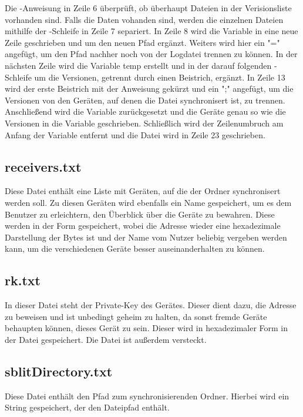 Die -Anweisung in Zeile 6 überprüft, ob überhaupt Dateien in der Verisionsliste vorhanden sind. Falls die Daten vohanden sind, werden die einzelnen Dateien mithilfe der -Schleife in Zeile 7 separiert. In Zeile 8 wird die  Variable in eine neue Zeile geschrieben und um den neuen Pfad ergänzt. Weiters wird hier ein "=" angefügt, um den Pfad nachher noch von der Logdatei trennen zu können. In der nächsten Zeile wird die Variable temp erstellt und in der darauf folgenden -Schleife um die Versionen, getrennt durch einen Beistrich, ergänzt. In Zeile 13 wird der erste Beistrich mit der Anweisung  gekürzt und ein ";" angefügt, um die Versionen von den Geräten, auf denen die Datei synchronisert ist, zu trennen. Anschließend wird die Variable  zurückgesetzt und die Geräte genau so wie die Versionen in die Variable  geschrieben. Schließlich wird der Zeilenumbruch am Anfang der Variable  entfernt und die Datei wird in Zeile 23 geschrieben.

\subsection{receivers.txt} \label{receivers}
Diese Datei enthält eine Liste mit Geräten, auf die der Ordner synchronisert werden soll. Zu diesen Geräten wird ebenfalls ein Name gespeichert, um es dem Benutzer zu erleichtern, den Überblick über die Geräte zu bewahren. Diese werden in der Form  gespeichert, wobei die Adresse wieder eine hexadezimale Darstellung der Bytes ist und der Name vom Nutzer beliebig vergeben werden kann, um die verschiedenen Geräte besser auseinanderhalten zu können.

\subsection{rk.txt}
In dieser Datei steht der Private-Key des Gerätes. Dieser dient dazu, die Adresse zu beweisen und ist unbedingt geheim zu halten, da sonst fremde Geräte behaupten können, dieses Gerät zu sein. Dieser wird in hexadezimaler Form in der Datei gespeichert. Die Datei ist außerdem versteckt.

\subsection{sblitDirectory.txt}
Diese Datei enthält den Pfad zum synchronisierenden Ordner. Hierbei wird ein String gespeichert, der den Dateipfad enthält. 

